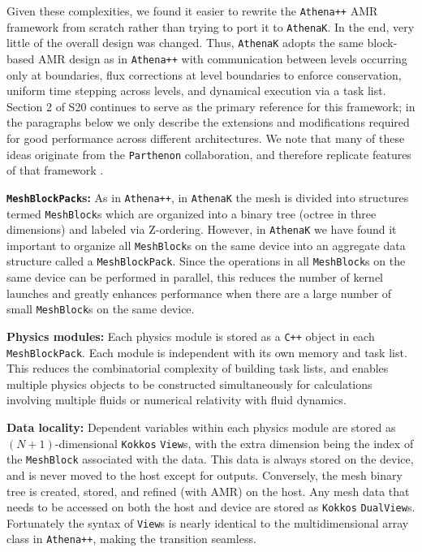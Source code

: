 \documentclass[twocolumn, floatfix]{aastex63}
\newcommand{\app}{\texttt{Athena++}}
\newcommand{\ak}{\texttt{AthenaK}}
\newcommand{\kokkos}{\texttt{Kokkos}}
\newcommand{\parth}{\texttt{Parthenon}}
\begin{document}
Given these complexities, we found it easier to rewrite the \app{} AMR framework from scratch rather than trying to port it to \ak{}.  In the end, very little of the overall design was changed.  Thus, \ak{} adopts the same block-based AMR design as in \app{} with communication between levels occurring only at boundaries, flux corrections at level boundaries to enforce conservation, uniform time stepping across levels, and dynamical execution via a task list.  Section 2 of S20 continues to serve as the primary reference for this framework; in the paragraphs below we only describe the extensions and modifications required for good performance across different architectures.  We note that many of these ideas originate from the \parth{} collaboration, and therefore replicate features of that framework \citep{grete2022}.


{\bf \texttt{MeshBlockPack}s:} As in \app{}, in \ak{} the mesh is divided into structures termed \texttt{MeshBlock}s which are organized into a binary tree (octree in three dimensions) and labeled via Z-ordering.  However, in \ak{} we have found it important to organize all \texttt{MeshBlock}s on the same device into an aggregate data structure called a \texttt{MeshBlockPack}.  Since the operations in all \texttt{MeshBlock}s on the same device can be performed in parallel, this reduces the number of kernel launches and greatly enhances performance when there are a large number of small \texttt{MeshBlock}s on the same device.

{\bf Physics modules:} Each physics module is stored as a \texttt{C++} object in each {\tt MeshBlockPack}. Each module is independent with its own memory and task list. This reduces the combinatorial complexity of building task lists, and enables multiple physics objects to be constructed simultaneously for calculations involving multiple fluids or numerical relativity with fluid dynamics. 

{\bf Data locality:} Dependent variables within each physics module are stored as $(N+1)$-dimensional \kokkos{} {\tt View}s, with the extra dimension being the index of the \texttt{MeshBlock} associated with the data. This data is always stored on the device, and is never moved to the host except for outputs. Conversely, the mesh binary tree is created, stored, and refined (with AMR) on the host. Any mesh data that needs to be accessed on both the host and device are stored as \kokkos{} {\tt DualView}s. Fortunately the syntax of {\tt View}s is nearly identical to the multidimensional array class in \app{}, making the transition seamless.
\end{document}
